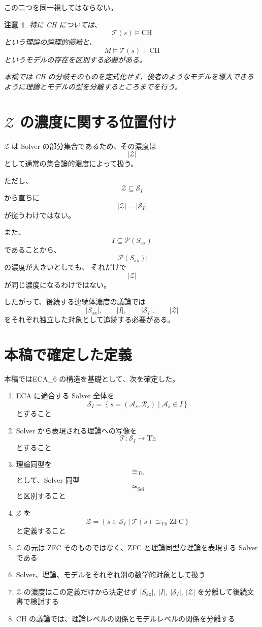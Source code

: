 \documentclass[a4paper,11pt]{jsarticle}
\newtheorem{remark}[definition]{注意}
\newcommand{\Solver}{\mathcal{S}}
\newcommand{\Ax}{S_{\mathrm{ax}}}
\newcommand{\Th}{\mathrm{Th}}
\begin{document}
この二つを同一視してはならない。

\begin{remark}
特に CH については、
\[
\mathcal{T}(s)\models\mathrm{CH}
\]
という理論の論理的帰結と、
\[
M\models\mathcal{T}(s)+\mathrm{CH}
\]
というモデルの存在を区別する必要がある。

本稿では CH の分岐そのものを定式化せず、後者のようなモデルを導入できるように理論とモデルの型を分離するところまでを行う。
\end{remark}

\section{$\mathcal{Z}$ の濃度に関する位置付け}

$\mathcal{Z}$ は Solver の部分集合であるため、その濃度は
\[
|\mathcal{Z}|
\]
として通常の集合論的濃度によって扱う。

ただし、
\[
\mathcal{Z}
\subseteq
\Solver_I
\]
から直ちに
\[
|\mathcal{Z}|=|\Solver_I|
\]
が従うわけではない。

また、
\[
I\subseteq\mathcal{P}(\Ax)
\]
であることから、
\[
|\mathcal{P}(\Ax)|
\]
の濃度が大きいとしても、
それだけで
\[
|\mathcal{Z}|
\]
が同じ濃度になるわけではない。

したがって、後続する連続体濃度の議論では
\[
|\Ax|,
\qquad
|I|,
\qquad
|\Solver_I|,
\qquad
|\mathcal{Z}|
\]
をそれぞれ独立した対象として追跡する必要がある。

\section{本稿で確定した定義}

本稿ではECA_6 の構造を基礎として、次を確定した。

\begin{enumerate}
\item ECA に適合する Solver 全体を
\[
\Solver_I
=
\left\{
s=(\mathcal{A}_s,\mathcal{R}_s)
\mid
\mathcal{A}_s\in I
\right\}
\]
とすること

\item Solver から表現される理論への写像を
\[
\mathcal{T}:\Solver_I\to\Th
\]
とすること

\item 理論同型を
\[
\cong_{\mathrm{Th}}
\]
として、Solver 同型
\[
\cong_{\mathrm{Sol}}
\]
と区別すること

\item $\mathcal{Z}$ を
\[
\boxed{
\mathcal{Z}
=
\left\{
s\in\Solver_I
\mid
\mathcal{T}(s)\cong_{\mathrm{Th}}\mathrm{ZFC}
\right\}
}
\]
と定義すること

\item $\mathcal{Z}$ の元は ZFC そのものではなく、ZFC と理論同型な理論を表現する Solver である
\item Solver、理論、モデルをそれぞれ別の数学的対象として扱う
\item $\mathcal{Z}$ の濃度はこの定義だけから決定せず $|\Ax|,\ |I|,\ |\Solver_I|,\ |\mathcal{Z}|$ を分離して後続文書で検討する
\item CH の議論では、理論レベルの関係とモデルレベルの関係を分離する
\end{enumerate}
\end{document}
